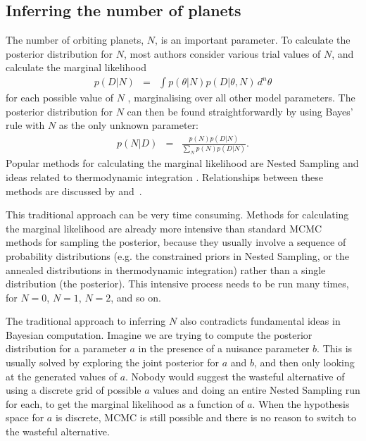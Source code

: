 \documentclass[useAMS,usenatbib]{mn2e}
\begin{document}
\subsection{Inferring the number of planets}
The number of orbiting planets, $N$, is an important parameter.
To calculate the posterior distribution for $N$, most authors
consider various trial values of $N$, and calculate the marginal likelihood
\begin{eqnarray}
p(D | N) &=& \int p(\theta | N) p(D | \theta, N) \, d^n \theta
\end{eqnarray}
for each possible value of $N$
\citep[e.g.][]{2011MNRAS.415.2523G, 2011MNRAS.415.3462F, 2014MNRAS.437.3540F, fengji}, marginalising
over all other model parameters.
The posterior distribution for $N$ can then be found straightforwardly by
using Bayes' rule with $N$ as the only unknown parameter:
\begin{eqnarray}
p(N | D) &=& \frac{p(N)p(D | N)}{\sum_N p(N)p(D | N)}.
\end{eqnarray}
Popular
methods for calculating the marginal likelihood are Nested Sampling
\citep{skilling} and ideas related to thermodynamic integration
\citep[e.g.][]{neal}. Relationships between these methods are discussed by
\citet{cameron} and~\citet{scott}.

This traditional approach can be very time consuming.
Methods for calculating the marginal likelihood are
already more intensive than standard MCMC methods for sampling the posterior,
because they usually involve a sequence of probability distributions
(e.g. the constrained priors in Nested Sampling, or the annealed distributions
in thermodynamic integration) rather than a single distribution (the posterior).
This intensive process needs to be run many times, for $N=0$, $N=1$, $N=2$, and
so on.

The traditional approach to inferring $N$ also contradicts
fundamental ideas in Bayesian
computation. Imagine we are trying to compute the posterior distribution for
a parameter $a$ in the presence of a nuisance parameter $b$. This is usually solved
by exploring the joint posterior for $a$ and $b$, and then only looking at the
generated values of $a$. Nobody would suggest the wasteful alternative
of using a discrete grid of possible $a$ values and doing an entire Nested
Sampling run for each, to get the marginal likelihood as a function of $a$.
When the hypothesis space for $a$ is discrete, MCMC is still possible and there
is no reason to switch to the wasteful alternative.
\end{document}
